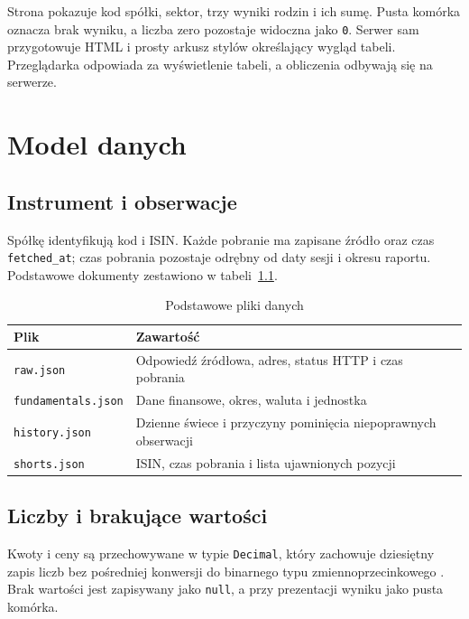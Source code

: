 \documentclass[12pt,a4paper,twoside]{report}
\begin{document}
Strona pokazuje kod spółki, sektor, trzy wyniki rodzin i ich sumę. Pusta komórka oznacza brak wyniku, a liczba zero pozostaje widoczna jako \texttt{0}. Serwer sam przygotowuje HTML i prosty arkusz stylów określający wygląd tabeli. Przeglądarka odpowiada za wyświetlenie tabeli, a obliczenia odbywają się na serwerze.


\cleardoublepage
\chapter{Model danych}
\label{chap:model}

\section{Instrument i obserwacje}

Spółkę identyfikują kod i ISIN. Każde pobranie ma zapisane źródło oraz czas \texttt{fetched\_at}; czas pobrania pozostaje odrębny od daty sesji i okresu raportu. Podstawowe dokumenty zestawiono w tabeli~\ref{tab:documents}.

\begin{table}[htbp]
\centering
\caption{Podstawowe pliki danych}
\label{tab:documents}
\small
\begin{tabularx}{\textwidth}{p{4cm}X}
\toprule
Plik & Zawartość \\
\midrule
\texttt{raw.json} & Odpowiedź źródłowa, adres, status HTTP i czas pobrania \\
\texttt{fundamentals.json} & Dane finansowe, okres, waluta i jednostka \\
\texttt{history.json} & Dzienne świece i przyczyny pominięcia niepoprawnych obserwacji \\
\texttt{shorts.json} & ISIN, czas pobrania i lista ujawnionych pozycji \\
\bottomrule
\end{tabularx}
\end{table}

\section{Liczby i brakujące wartości}

Kwoty i ceny są przechowywane w typie \texttt{Decimal}, który zachowuje dziesiętny zapis liczb bez pośredniej konwersji do binarnego typu zmiennoprzecinkowego \cite{decimal}. Brak wartości jest zapisywany jako \texttt{null}, a przy prezentacji wyniku jako pusta komórka.
\end{document}
